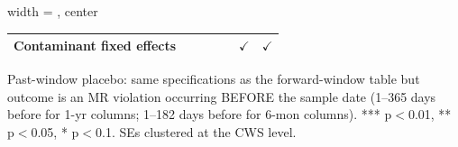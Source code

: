\begin{table}[htbp]
\begin{adjustbox}{width = \textwidth, center}
\begin{tabular}{lcccccc}
      Contaminant fixed effects  &                        &                      &                   &                      & $\checkmark$       & $\checkmark$\\   
      \bottomrule
   \end{tabular}
\end{adjustbox}
{\tiny\linespread{1}\selectfont \par \raggedright Past-window placebo: same specifications as the forward-window table but outcome is an MR violation occurring BEFORE the sample date (1--365 days before for 1-yr columns; 1--182 days before for 6-mon columns). *** p$<$0.01, ** p$<$0.05, * p$<$0.1. SEs clustered at the CWS level.}
\end{table}
